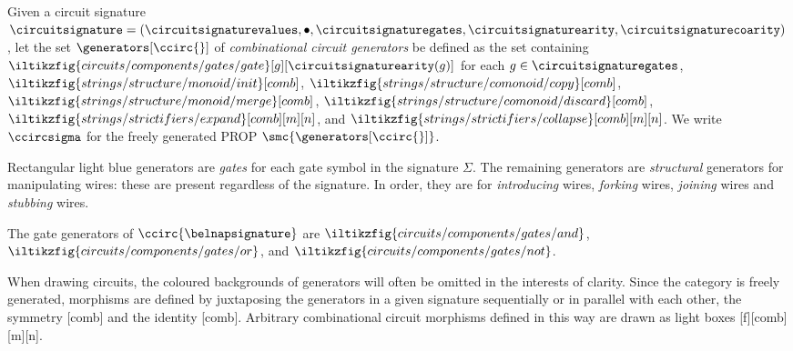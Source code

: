 \begin{definition}
    Given a circuit signature \(
        \circuitsignature = (
            \circuitsignaturevalues,
            \bullet,
            \circuitsignaturegates,
            \circuitsignaturearity,
            \circuitsignaturecoarity
        )
    \), let the set \(\generators[\ccirc{}]\) of
    \emph{combinational circuit generators} be defined as the set containing \(
        \iltikzfig{circuits/components/gates/gate}[g][\circuitsignaturearity(g)]
    \) for each \(g \in \circuitsignaturegates\),
    \(\iltikzfig{strings/structure/monoid/init}[comb]\),
    \(\iltikzfig{strings/structure/comonoid/copy}[comb]\),
    \(\iltikzfig{strings/structure/monoid/merge}[comb]\),
    \(\iltikzfig{strings/structure/comonoid/discard}[comb]\),
    \(\iltikzfig{strings/strictifiers/expand}[comb][m][n]\), and
    \(\iltikzfig{strings/strictifiers/collapse}[comb][m][n]\).
    We write \(\ccircsigma\) for the freely generated PROP
    \(\smc{\generators[\ccirc{}]}\).
\end{definition}

Rectangular light blue generators are \emph{gates} for each gate symbol in the
signature \(\Sigma\).
The remaining generators are \emph{structural} generators for manipulating
wires: these are present regardless of the signature.
In order, they are for \emph{introducing} wires, \emph{forking}
wires, \emph{joining} wires and \emph{stubbing} wires.

\begin{example}
    The gate generators of \(\ccirc{\belnapsignature}\) are \(
        \iltikzfig{circuits/components/gates/and}
    \), \(
        \iltikzfig{circuits/components/gates/or}
    \), and \(
        \iltikzfig{circuits/components/gates/not}
    \).
\end{example}

When drawing circuits, the coloured backgrounds of generators will often be
omitted in the interests of clarity.
Since the category is freely generated, morphisms are defined by
juxtaposing the generators in a given signature sequentially or in parallel with
each other, the symmetry [comb] and the
identity [comb].
Arbitrary combinational circuit morphisms defined in this way are drawn as light
boxes [f][comb][m][n].


